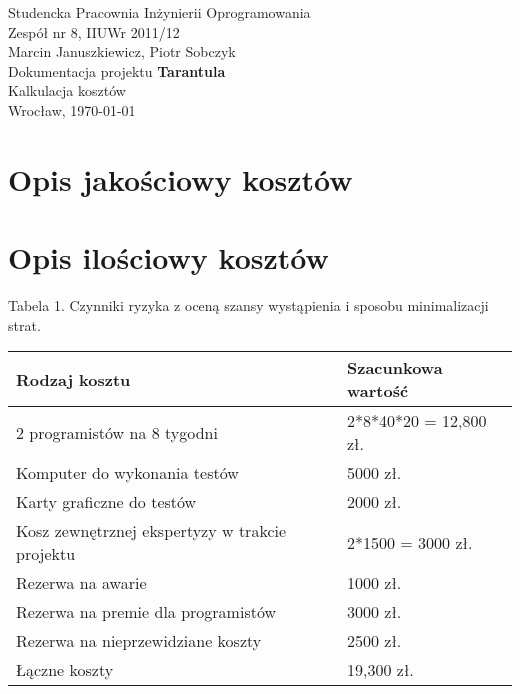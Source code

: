 \documentclass[11pt,leqno]{article}
\begin{document}
 



\begin{center}
\thispagestyle{empty}
{\Large Studencka Pracownia Inżynierii Oprogramowania}\\[0.5cm]
{\Large Zespół nr 8, IIUWr 2011/12}\\[2.5cm]

{Marcin Januszkiewicz, Piotr Sobczyk}\\[0.5cm]
{\huge Dokumentacja projektu \textbf{Tarantula}}\\[0.25cm]
{ Kalkulacja kosztów}\\[0.5cm]
\vfill
{\large Wrocław, \today}
\end{center}

\newpage
\tableofcontents
\newpage

\section{Opis jakościowy kosztów}

\section{Opis ilościowy kosztów}

\vspace{1 cm}
\hspace{-1.5cm}
{\small Tabela 1. Czynniki ryzyka z oceną szansy wystąpienia i sposobu minimalizacji strat.}
 \begin{tabular}{|p{10cm}|p{2cm}|}
  \hline
 Rodzaj kosztu & Szacunkowa wartość  \\ \hline
  2 programistów na 8 tygodni & 2*8*40*20 = 12,800 zł. \\ \hline
 Komputer do wykonania testów & 5000 zł. \\ \hline
 Karty graficzne do testów & 2000 zł. \\ \hline
 Kosz zewnętrznej ekspertyzy w trakcie projektu & 2*1500 = 3000 zł. \\ \hline
Rezerwa na awarie & 1000 zł. \\ \hline
Rezerwa na premie dla programistów & 3000 zł. \\ \hline
Rezerwa na nieprzewidziane koszty & 2500 zł. \\ \hline
Łączne koszty & 19,300 zł. \\ \hline
 \end{tabular}
\end{document}
